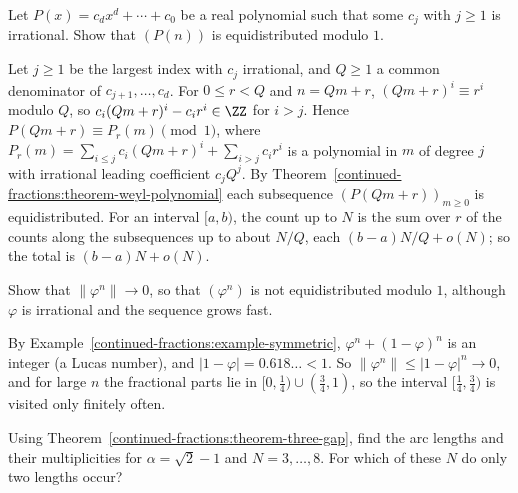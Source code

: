 \begin{exercise}\label{continued-fractions:exercise-weyl-general}
Let $P(x) = c_dx^d + \cdots + c_0$ be a real polynomial such that some $c_j$ with $j \geq 1$ is irrational. Show that $(P(n))$ is equidistributed modulo $1$.
\end{exercise}

\begin{solution}
Let $j \geq 1$ be the largest index with $c_j$ irrational, and $Q \geq 1$ a common denominator of $c_{j+1}, \ldots, c_d$. For $0 \leq r < Q$ and $n = Qm + r$, $(Qm + r)^i \equiv r^i$ modulo $Q$, so
$c_i(Qm + r)^i - c_ir^i \in \ZZ$ for $i > j$. Hence $P(Qm + r) \equiv P_r(m) \pmod 1$, where $P_r(m) = \sum_{i \leq j}c_i(Qm + r)^i + \sum_{i > j}c_ir^i$ is a polynomial in $m$ of degree $j$ with
irrational leading coefficient $c_jQ^j$. By Theorem~\ref{continued-fractions:theorem-weyl-polynomial} each subsequence $(P(Qm + r))_{m \geq 0}$ is equidistributed. For an interval $[a, b)$, the count up
to $N$ is the sum over $r$ of the counts along the subsequences up to about $N/Q$, each $(b - a)N/Q + o(N)$; so the total is $(b - a)N + o(N)$.
\end{solution}

\begin{exercise}\label{continued-fractions:exercise-golden-powers}
Show that $\lVert\varphi^n\rVert \to 0$, so that $(\varphi^n)$ is not equidistributed modulo $1$, although $\varphi$ is irrational and the sequence grows fast.
\end{exercise}

\begin{solution}
By Example~\ref{continued-fractions:example-symmetric}, $\varphi^n + (1 - \varphi)^n$ is an integer (a Lucas number), and $|1 - \varphi| = 0.618\ldots < 1$. So $\lVert\varphi^n\rVert \leq |1 - \varphi|^n \to 0$,
and for large $n$ the fractional parts lie in $[0, \frac14) \cup (\frac34, 1)$, so the interval $[\frac14, \frac34)$ is visited only finitely often.
\end{solution}

\begin{exercise}\label{continued-fractions:exercise-three-gap-small}
Using Theorem~\ref{continued-fractions:theorem-three-gap}, find the arc lengths and their multiplicities for $\alpha = \sqrt2 - 1$ and $N = 3, \ldots, 8$. For which of these $N$ do only two lengths occur?
\end{exercise}


